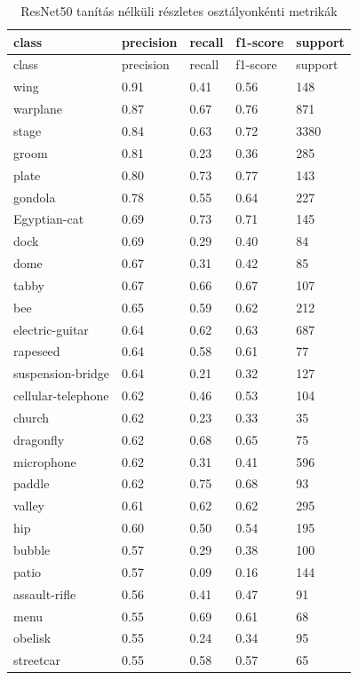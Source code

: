 \begin{center}
\begin{longtable}{lllll}
\caption{ResNet50 tanítás nélküli részletes osztályonkénti metrikák}\label{tab:phase1_resnet50_class_table}\\
\toprule
class & precision & recall & f1-score & support \\
\midrule
\endfirsthead
\toprule
class & precision & recall & f1-score & support \\
\midrule
\endhead
wing & 0.91 & 0.41 & 0.56 & 148 \\
warplane & 0.87 & 0.67 & 0.76 & 871 \\
stage & 0.84 & 0.63 & 0.72 & 3380 \\
groom & 0.81 & 0.23 & 0.36 & 285 \\
plate & 0.80 & 0.73 & 0.77 & 143 \\
gondola & 0.78 & 0.55 & 0.64 & 227 \\
Egyptian-cat & 0.69 & 0.73 & 0.71 & 145 \\
dock & 0.69 & 0.29 & 0.40 & 84 \\
dome & 0.67 & 0.31 & 0.42 & 85 \\
tabby & 0.67 & 0.66 & 0.67 & 107 \\
bee & 0.65 & 0.59 & 0.62 & 212 \\
electric-guitar & 0.64 & 0.62 & 0.63 & 687 \\
rapeseed & 0.64 & 0.58 & 0.61 & 77 \\
suspension-bridge & 0.64 & 0.21 & 0.32 & 127 \\
cellular-telephone & 0.62 & 0.46 & 0.53 & 104 \\
church & 0.62 & 0.23 & 0.33 & 35 \\
dragonfly & 0.62 & 0.68 & 0.65 & 75 \\
microphone & 0.62 & 0.31 & 0.41 & 596 \\
paddle & 0.62 & 0.75 & 0.68 & 93 \\
valley & 0.61 & 0.62 & 0.62 & 295 \\
hip & 0.60 & 0.50 & 0.54 & 195 \\
bubble & 0.57 & 0.29 & 0.38 & 100 \\
patio & 0.57 & 0.09 & 0.16 & 144 \\
assault-rifle & 0.56 & 0.41 & 0.47 & 91 \\
menu & 0.55 & 0.69 & 0.61 & 68 \\
obelisk & 0.55 & 0.24 & 0.34 & 95 \\
streetcar & 0.55 & 0.58 & 0.57 & 65 \\

\end{longtable}
\end{center}
